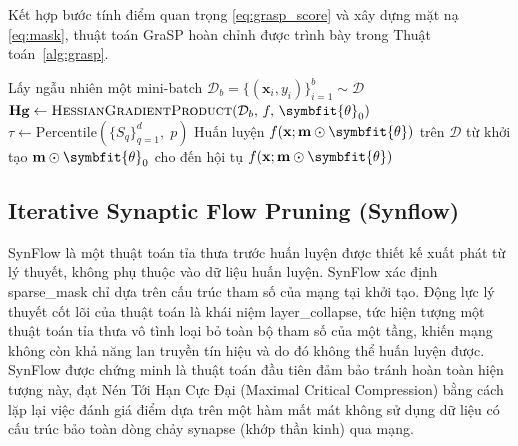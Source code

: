 Kết hợp bước tính điểm quan trọng \eqref{eq:grasp_score} và xây dựng
mặt nạ \eqref{eq:mask}, thuật toán GraSP hoàn chỉnh được trình bày trong
Thuật toán~\ref{alg:grasp}.

\begin{algorithm}[H]
    \caption{Bảo toàn tín hiệu gradient (GraSP)}
    \label{alg:grasp}
    \DontPrintSemicolon
    \SetAlgoLined
    \BlankLine
    Lấy ngẫu nhiên một mini-batch
    $\mathcal{D}_b = \{(\mathbf{x}_i, y_i)\}_{i=1}^{b} \sim \mathcal{D}$\;
    \BlankLine
    $\mathbf{Hg} \leftarrow \textsc{HessianGradientProduct}(\mathcal{D}_b,\,f,\,\symbfit{\theta}_0)$\;
    \BlankLine
    \BlankLine
    $\tau \leftarrow \mathrm{Percentile}\!\left(\{S_q\}_{q=1}^{d},\; p\right)$\;
    \BlankLine
    \BlankLine
    Huấn luyện $f(\mathbf{x};\mathbf{m}\odot\symbfit{\theta})$ trên $\mathcal{D}$
    từ khởi tạo $\mathbf{m}\odot\symbfit{\theta}_0$ cho đến hội tụ\;
    \BlankLine
    \Return $f(\mathbf{x};\mathbf{m}\odot\symbfit{\theta})$\;
\end{algorithm}

\subsection{Iterative Synaptic Flow Pruning (Synflow)}
SynFlow \cite{synflow} là một thuật
toán tỉa thưa trước huấn luyện được
thiết kế xuất phát từ lý thuyết, không phụ thuộc vào dữ liệu huấn luyện.
SynFlow xác định 
\gls{sparse_mask} chỉ dựa trên cấu trúc tham số của mạng tại khởi tạo.
Động lực lý thuyết cốt lõi của thuật toán là khái niệm 
\gls{layer_collapse}, tức hiện tượng một thuật toán tỉa thưa vô tình loại bỏ
toàn bộ tham số của một tầng, khiến mạng không còn khả năng lan truyền tín hiệu
và do đó không thể huấn luyện được. SynFlow được chứng minh là thuật toán đầu
tiên đảm bảo tránh hoàn toàn hiện tượng này, đạt Nén Tới Hạn Cực Đại
(Maximal Critical Compression) bằng cách lặp lại việc đánh giá điểm
dựa trên một hàm mất mát không sử dụng dữ liệu có cấu trúc bảo toàn dòng chảy
synapse (khớp thần kinh) qua mạng.

